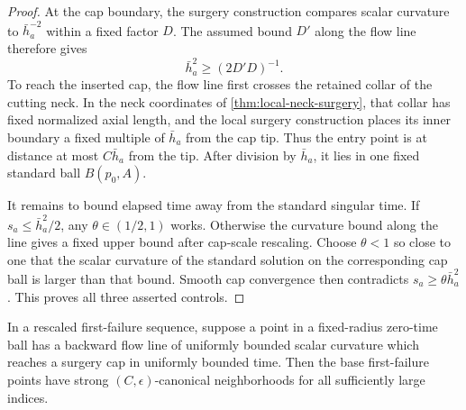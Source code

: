 \begin{proof}
At the cap boundary, the surgery construction compares scalar curvature to
$\bar h_a^{-2}$ within a fixed factor $D$.  The assumed bound $D'$ along the
flow line therefore gives
\[
 \bar h_a^2\ge(2D'D)^{-1}.
\]
To reach the inserted cap, the flow line first crosses the retained collar
of the cutting neck.  In the neck coordinates of
\ref{thm:local-neck-surgery}, that collar has fixed normalized axial length,
and the local surgery construction places its inner boundary a fixed
multiple of $\bar h_a$ from the cap tip.  Thus the entry point is at distance
at most $C\bar h_a$ from the tip.  After division by $\bar h_a$, it lies in
one fixed standard ball $B(p_0,A)$.

It remains to bound elapsed time away from the standard singular time.  If
$s_a\le\bar h_a^2/2$, any $\theta\in(1/2,1)$ works.  Otherwise the curvature
bound along the line gives a fixed upper bound after cap-scale rescaling.
Choose $\theta<1$ so close to one that the scalar curvature of the standard
solution on the corresponding cap ball is larger than that bound.  Smooth
cap convergence then contradicts $s_a\ge\theta\bar h_a^2$.  This proves all
three asserted controls.
\end{proof}

\begin{lemma}
\label{lem:bounded-flow-line-cap-exclusion}
\notready
In a rescaled first-failure sequence, suppose a point in a fixed-radius
zero-time ball has a backward flow line of uniformly bounded scalar
curvature which reaches a surgery cap in uniformly bounded time.  Then the
base first-failure points have strong $(C,\epsilon)$-canonical neighborhoods
for all sufficiently large indices.
\end{lemma}

